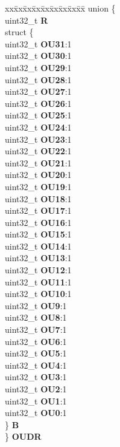 \begin{DoxyCompactItemize}
\begin{tabbing}
\end{tabbing}\item 
\mbox{\label{structEMIOS__tag_af955ab34a293d99fa065b092f5396dc5}} 
\begin{tabbing}
xx\=xx\=xx\=xx\=xx\=xx\=xx\=xx\=xx\=\kill
union \{\\
\>uint32\_t {\bfseries R}\\
\>struct \{\\
\>\>uint32\_t {\bfseries OU31}:1\\
\>\>uint32\_t {\bfseries OU30}:1\\
\>\>uint32\_t {\bfseries OU29}:1\\
\>\>uint32\_t {\bfseries OU28}:1\\
\>\>uint32\_t {\bfseries OU27}:1\\
\>\>uint32\_t {\bfseries OU26}:1\\
\>\>uint32\_t {\bfseries OU25}:1\\
\>\>uint32\_t {\bfseries OU24}:1\\
\>\>uint32\_t {\bfseries OU23}:1\\
\>\>uint32\_t {\bfseries OU22}:1\\
\>\>uint32\_t {\bfseries OU21}:1\\
\>\>uint32\_t {\bfseries OU20}:1\\
\>\>uint32\_t {\bfseries OU19}:1\\
\>\>uint32\_t {\bfseries OU18}:1\\
\>\>uint32\_t {\bfseries OU17}:1\\
\>\>uint32\_t {\bfseries OU16}:1\\
\>\>uint32\_t {\bfseries OU15}:1\\
\>\>uint32\_t {\bfseries OU14}:1\\
\>\>uint32\_t {\bfseries OU13}:1\\
\>\>uint32\_t {\bfseries OU12}:1\\
\>\>uint32\_t {\bfseries OU11}:1\\
\>\>uint32\_t {\bfseries OU10}:1\\
\>\>uint32\_t {\bfseries OU9}:1\\
\>\>uint32\_t {\bfseries OU8}:1\\
\>\>uint32\_t {\bfseries OU7}:1\\
\>\>uint32\_t {\bfseries OU6}:1\\
\>\>uint32\_t {\bfseries OU5}:1\\
\>\>uint32\_t {\bfseries OU4}:1\\
\>\>uint32\_t {\bfseries OU3}:1\\
\>\>uint32\_t {\bfseries OU2}:1\\
\>\>uint32\_t {\bfseries OU1}:1\\
\>\>uint32\_t {\bfseries OU0}:1\\
\>\} {\bfseries B}\\
\} {\bfseries OUDR}\\


\end{tabbing}
\end{DoxyCompactItemize}
